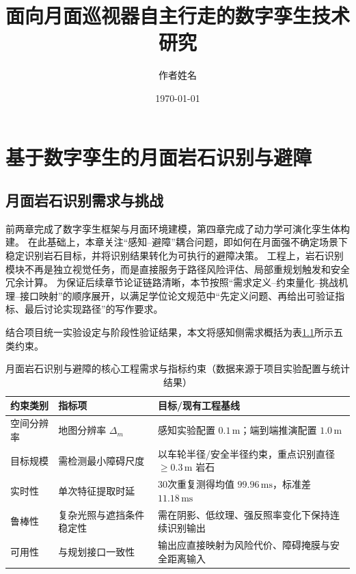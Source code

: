 \documentclass[UTF8,zihao=-4,a4paper,oneside,openany]{ctexrep}
\title{面向月面巡视器自主行走的数字孪生技术研究}
\author{作者姓名}
\date{\today}
\numberwithin{equation}{chapter}
\renewcommand{\small}{\normalsize}
\renewcommand{\small}{\normalsize}
\theoremstyle{plain}
\theoremstyle{definition}
\begin{document}
\maketitle


\chapter{基于数字孪生的月面岩石识别与避障}
\label{ch:perception}

\section{月面岩石识别需求与挑战}
\label{sec:ch5_requirements}

前两章完成了数字孪生框架与月面环境建模，第四章完成了动力学可演化孪生体构建。
在此基础上，本章关注“感知--避障”耦合问题，即如何在月面强不确定场景下稳定识别岩石目标，并将识别结果转化为可执行的避障决策。
工程上，岩石识别模块不再是独立视觉任务，而是直接服务于路径风险评估、局部重规划触发和安全冗余计算。
为保证后续章节论证链路清晰，本节按照“需求定义--约束量化--挑战机理--接口映射”的顺序展开，以满足学位论文规范中“先定义问题、再给出可验证指标、最后讨论实现路径”的写作要求。

结合项目统一实验设定与阶段性验证结果\cite{wang2026raumfahrt}，本文将感知侧需求概括为表\ref{tab:ch5_requirements_metrics}所示五类约束。

\begin{table}[H]
	\centering
	\small
	\caption{月面岩石识别与避障的核心工程需求与指标约束（数据来源于项目实验配置与统计结果\cite{wang2026raumfahrt}）}
	\label{tab:ch5_requirements_metrics}
	\begin{tabular}{p{}p{}p{}}
		\toprule
		约束类别 & 指标项 & 目标/现有工程基线 \\
		\midrule
		空间分辨率 & 地图分辨率 $\Delta_m$ & 感知实验配置 $0.1\,\mathrm{m}$；端到端推演配置 $1.0\,\mathrm{m}$ \\
		目标规模 & 需检测最小障碍尺度 & 以车轮半径/安全半径约束，重点识别直径 $\ge 0.3\,\mathrm{m}$ 岩石 \\
		实时性 & 单次特征提取时延 & 30次重复测得均值 $99.96\,\mathrm{ms}$，标准差 $11.18\,\mathrm{ms}$ \\
		鲁棒性 & 复杂光照与遮挡条件稳定性 & 需在阴影、低纹理、强反照率变化下保持连续识别输出 \\
		可用性 & 与规划接口一致性 & 输出应直接映射为风险代价、障碍掩膜与安全距离输入 \\
		\bottomrule
	\end{tabular}
\end{table}
\end{document}
